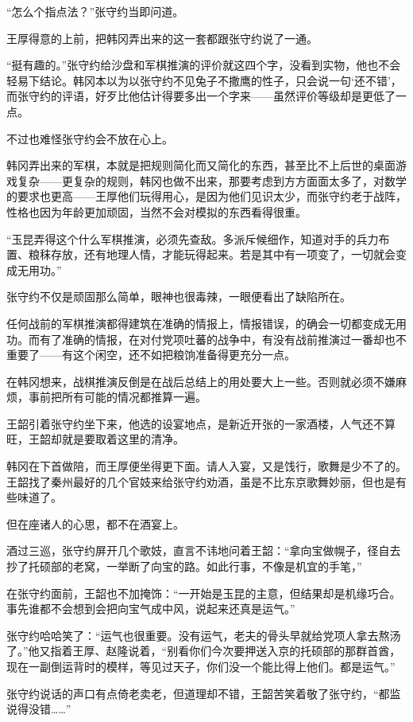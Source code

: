 “怎么个指点法？”张守约当即问道。

王厚得意的上前，把韩冈弄出来的这一套都跟张守约说了一通。

“挺有趣的。”张守约给沙盘和军棋推演的评价就这四个字，没看到实物，他也不会轻易下结论。韩冈本以为以张守约不见兔子不撒鹰的性子，只会说一句‘还不错’，而张守约的评语，好歹比他估计得要多出一个字来——虽然评价等级却是更低了一点。

不过也难怪张守约会不放在心上。

韩冈弄出来的军棋，本就是把规则简化而又简化的东西，甚至比不上后世的桌面游戏复杂——更复杂的规则，韩冈也做不出来，那要考虑到方方面面太多了，对数学的要求也更高——王厚他们玩得用心，是因为他们见识太少，而张守约老于战阵，性格也因为年龄更加顽固，当然不会对模拟的东西看得很重。

“玉昆弄得这个什么军棋推演，必须先查敌。多派斥候细作，知道对手的兵力布置、粮秣存放，还有地理人情，才能玩得起来。若是其中有一项变了，一切就会变成无用功。”

张守约不仅是顽固那么简单，眼神也很毒辣，一眼便看出了缺陷所在。

任何战前的军棋推演都得建筑在准确的情报上，情报错误，的确会一切都变成无用功。而有了准确的情报，在对付党项吐蕃的战争中，有没有战前推演过一番却也不重要了——有这个闲空，还不如把粮饷准备得更充分一点。

在韩冈想来，战棋推演反倒是在战后总结上的用处要大上一些。否则就必须不嫌麻烦，事前把所有可能的情况都推算一遍。

王韶引着张守约坐下来，他选的设宴地点，是新近开张的一家酒楼，人气还不算旺，王韶却就是要取着这里的清净。

韩冈在下首做陪，而王厚便坐得更下面。请人入宴，又是饯行，歌舞是少不了的。王韶找了秦州最好的几个官妓来给张守约劝酒，虽是不比东京歌舞妙丽，但也是有些味道了。

但在座诸人的心思，都不在酒宴上。

酒过三巡，张守约屏开几个歌妓，直言不讳地问着王韶：“拿向宝做幌子，径自去抄了托硕部的老窝，一举断了向宝的路。如此行事，不像是机宜的手笔，”

在张守约面前，王韶也不加掩饰：“一开始是玉昆的主意，但结果却是机缘巧合。事先谁都不会想到会把向宝气成中风，说起来还真是运气。”

张守约哈哈笑了：“运气也很重要。没有运气，老夫的骨头早就给党项人拿去熬汤了。”他又指着王厚、赵隆说着，“别看你们今次要押送入京的托硕部的那群首酋，现在一副倒运背时的模样，等见过天子，你们没一个能比得上他们。都是运气。”

张守约说话的声口有点倚老卖老，但道理却不错，王韶苦笑着敬了张守约，“都监说得没错……”

